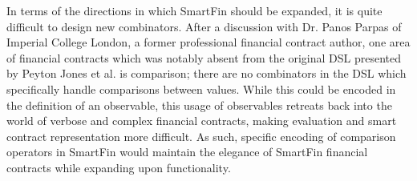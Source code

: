 In terms of the directions in which SmartFin should be expanded, it is quite difficult to design new combinators. After a discussion with Dr. Panos Parpas of Imperial College London, a former professional financial contract author, one area of financial contracts which was notably absent from the original DSL presented by Peyton Jones et al.\cite{SPJ} is comparison; there are no combinators in the DSL which specifically handle comparisons between values. While this could be encoded in the definition of an observable, this usage of observables retreats back into the world of verbose and complex financial contracts, making evaluation and smart contract representation more difficult. As such, specific encoding of comparison operators in SmartFin would maintain the elegance of SmartFin financial contracts while expanding upon functionality.